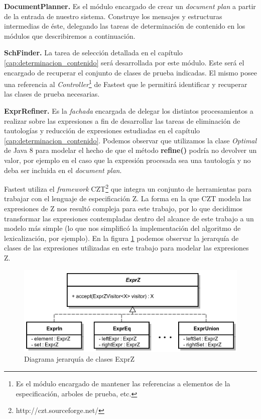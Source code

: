 \bigskip
\noindent
\textbf{DocumentPlanner.} Es el módulo encargado de crear un \textit{document plan} a partir de la entrada de nuestro sistema. Construye los mensajes y estructuras intermedias de éste, delegando las tareas de determinación de contenido en los módulos que describiremos a continuación.

\bigskip
\noindent
\textbf{SchFinder.} La tarea de selección detallada en el capítulo \ref{cap:determinacion_contenido} será desarrollada por este módulo. Este será el encargado de recuperar el conjunto de clases de prueba indicadas. El mismo posee una referencia al \emph{Controller}\footnote{Es el módulo encargado de mantener las referencias a elementos de la especificación, arboles de prueba, etc.} de Fastest que le permitirá identificar y recuperar las clases de prueba necesarias. 


\bigskip
\noindent
\textbf{ExprRefiner.} Es la \textit{fachada} \cite{gof} encargada de delegar los distintos procesamientos a realizar sobre las expresiones a fin de desarrollar las tareas de eliminación de tautologías y reducción de expresiones estudiadas en el capítulo \ref{cap:determinacion_contenido}. Podemos observar que utilizamos la clase \emph{Optimal} de Java 8 para modelar el hecho de que el método \textbf{refine()} podría no devolver un valor, por ejemplo en el caso que la expresión procesada sea una tautología y no deba ser incluida en el \textit{document plan}.

\bigskip
Fastest utiliza el \textit{framework} CZT\footnote{http://czt.sourceforge.net/} que integra un conjunto de herramientas para trabajar con el lenguaje de especificación Z. La forma en la que CZT modela las expresiones de Z nos resultó compleja para este trabajo, por lo que decidimos transformar las expresiones contempladas dentro del alcance de este trabajo a un modelo más simple (lo que nos simplificó la implementación del algoritmo de lexicalización, por ejemplo). En la figura \ref{fig:imp_exprz} podemos observar la jerarquía de clases de las expresiones utilizadas en este trabajo para modelar las expresiones Z. 

\begin{figure}[H]
  	\centering
	\includegraphics[scale=0.31]{img/exprz_imp.png}
	\caption{Diagrama jerarquía de clases ExprZ}
  	\label{fig:imp_exprz}
\end{figure}

